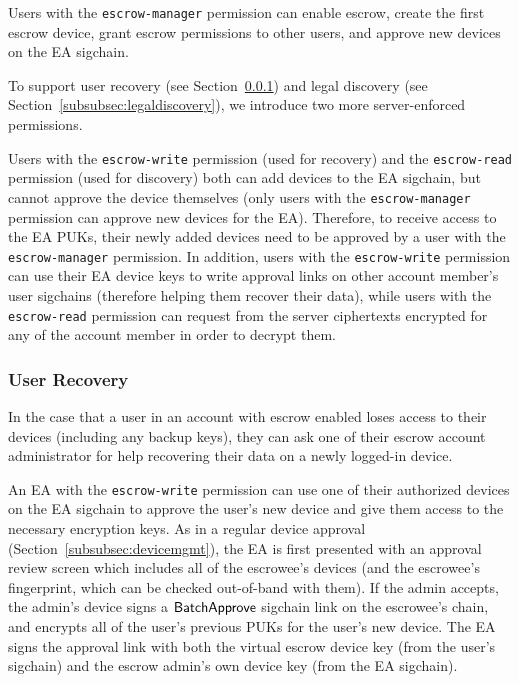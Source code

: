 Users with the \texttt{escrow-manager} permission can enable escrow, create the first escrow device,
grant escrow permissions to other users, and approve new devices on the EA sigchain.

To support user recovery (see Section~\ref{subsubsec:userrecovery}) and legal discovery (see
Section~\ref{subsubsec:legaldiscovery}), we introduce two more server-enforced permissions. 

Users with the \texttt{escrow-write} permission (used for recovery) and the \texttt{escrow-read}
permission (used for discovery) both can add devices to the EA sigchain, but cannot approve the
device themselves (only users with the \texttt{escrow-manager} permission can approve new devices
for the EA). Therefore, to receive access to the EA PUKs, their newly added devices need to be
approved by a user with the \texttt{escrow-manager} permission. In addition, users with the
\texttt{escrow-write} permission can use their EA device keys to write approval links on other
account member's user sigchains (therefore helping them recover their data), while users with the
\texttt{escrow-read} permission can request from the server ciphertexts encrypted for any of the
account member in order to decrypt them.

\subsubsection{User Recovery}
\label{subsubsec:userrecovery}

In the case that a user in an account with escrow enabled loses access to their devices (including
any backup keys), they can ask one of their escrow account administrator for help recovering their
data on a newly logged-in device.

An EA with the \texttt{escrow-write} permission can use one of their authorized devices on the EA
sigchain to approve the user's new device and give them access to the necessary encryption keys. As
in a regular device approval (Section~\ref{subsubsec:devicemgmt}), the EA is first presented with an
approval review screen which includes all of the escrowee’s devices (and the escrowee's fingerprint,
which can be checked out-of-band with them). If the admin accepts, the admin's device signs a
$\mathsf{BatchApprove}{}$ sigchain link on the escrowee's chain, and encrypts all of the user's previous
PUKs for the user's new device. The EA signs the approval link with both the virtual escrow device
key (from the user's sigchain) and the escrow admin's own device key (from the EA sigchain).

